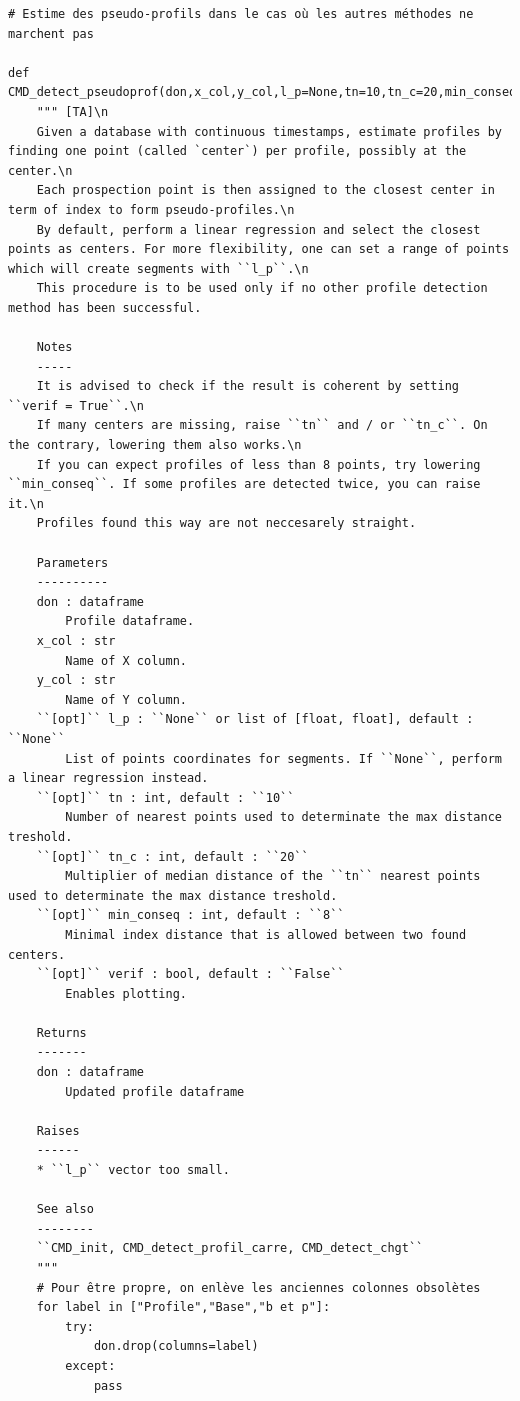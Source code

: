 \documentclass[12pt]{article}
\begin{document}
\begin{lstlisting}
# Estime des pseudo-profils dans le cas où les autres méthodes ne marchent pas

def CMD_detect_pseudoprof(don,x_col,y_col,l_p=None,tn=10,tn_c=20,min_conseq=8,verif=False):
    """ [TA]\n
    Given a database with continuous timestamps, estimate profiles by finding one point (called `center`) per profile, possibly at the center.\n
    Each prospection point is then assigned to the closest center in term of index to form pseudo-profiles.\n
    By default, perform a linear regression and select the closest points as centers. For more flexibility, one can set a range of points which will create segments with ``l_p``.\n
    This procedure is to be used only if no other profile detection method has been successful.
    
    Notes
    -----
    It is advised to check if the result is coherent by setting ``verif = True``.\n
    If many centers are missing, raise ``tn`` and / or ``tn_c``. On the contrary, lowering them also works.\n
    If you can expect profiles of less than 8 points, try lowering ``min_conseq``. If some profiles are detected twice, you can raise it.\n
    Profiles found this way are not neccesarely straight.
    
    Parameters
    ----------
    don : dataframe
        Profile dataframe.
    x_col : str
        Name of X column.
    y_col : str
        Name of Y column.
    ``[opt]`` l_p : ``None`` or list of [float, float], default : ``None``
        List of points coordinates for segments. If ``None``, perform a linear regression instead.
    ``[opt]`` tn : int, default : ``10``
        Number of nearest points used to determinate the max distance treshold.
    ``[opt]`` tn_c : int, default : ``20``
        Multiplier of median distance of the ``tn`` nearest points used to determinate the max distance treshold.
    ``[opt]`` min_conseq : int, default : ``8``
        Minimal index distance that is allowed between two found centers.
    ``[opt]`` verif : bool, default : ``False``
        Enables plotting.

    Returns
    -------
    don : dataframe
        Updated profile dataframe
    
    Raises
    ------
    * ``l_p`` vector too small.
    
    See also
    --------
    ``CMD_init, CMD_detect_profil_carre, CMD_detect_chgt`` 
    """
    # Pour être propre, on enlève les anciennes colonnes obsolètes
    for label in ["Profile","Base","b et p"]:
        try:
            don.drop(columns=label)
        except:
            pass
    

\end{lstlisting}
\end{document}
